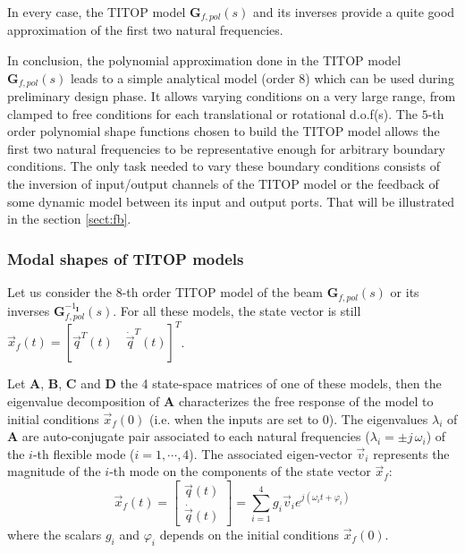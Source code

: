 In every case, the TITOP model $\mathbf{G}_{f,pol}(s)$ and its inverses provide a quite good approximation of the first two natural frequencies.

In conclusion, the polynomial approximation done in the TITOP model $\mathbf{G}_{f,pol}(s)$ leads to a simple analytical model (order $8$) which can be used during preliminary design phase. It allows varying conditions on a very large range, from clamped to free conditions for each translational or rotational d.o.f(s). The $5$-th order polynomial shape functions chosen to build the TITOP model allows the first two natural frequencies to be representative enough for arbitrary boundary conditions. The only task needed to vary these boundary conditions consists of the inversion of input/output channels of the TITOP model or the feedback of some dynamic model between its input and output ports. That will be illustrated in the  section \ref{sect:fb}. 

\subsubsection{Modal shapes of TITOP models }\label{sect:shape}
Let us consider the $8$-th order TITOP model of the beam  $\mathbf{G}_{f,pol}(s)$ or its inverses $\mathbf{G}_{f,pol}^{-1_{\mathbf{I}}}(s)$. For all these models, the state vector is still $\vec{x}_f(t)=[\vec{q}^T(t)\quad \dot{\vec{q}}^T(t)]^T$. 

Let $\mathbf{A}$, $\mathbf{B}$, $\mathbf{C}$ and $\mathbf{D}$ the 4 state-space matrices of one of these models, then the eigenvalue decomposition of $\mathbf{A}$ characterizes the free response of the model to initial conditions $\vec{x}_f(0)$ (i.e. when the inputs are set to $0$). The eigenvalues $\lambda_i$ of $\mathbf{A}$ are auto-conjugate pair associated to each natural frequencies ($\lambda_i=\pm j\,\omega_i$) of the $i$-th flexible mode ($i=1,\cdots,4$). The associated eigen-vector $\vec{v}_i$ represents the magnitude of the $i$-th mode on the components of the state vector $\vec{x}_f$:
\begin{equation}\label{eq:vf}
\vec{x}_f(t)=\left[\begin{array}{c} \vec{q}(t) \\ \dot{\vec{q}}(t)\end{array}\right]=\sum_{i=1}^4g_i\vec{v}_ie^{j(\omega_it+\varphi_i)}
\end{equation}
where the scalars $g_i$ and $\varphi_i$ depends on the initial conditions $\vec{x}_f(0)$. 

